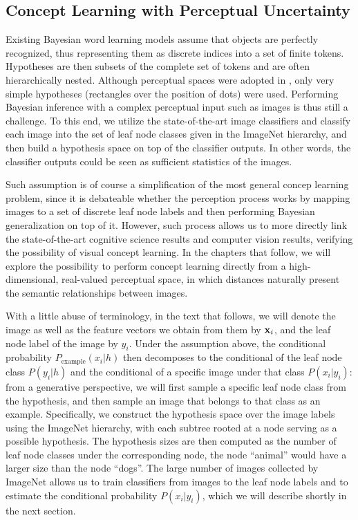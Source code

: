 \subsection{Concept Learning with Perceptual Uncertainty}
Existing Bayesian word learning models assume that objects are perfectly recognized, thus representing them as discrete indices into a set of finite tokens. Hypotheses are then subsets of the complete set of tokens and are often hierarchically nested. Although perceptual spaces were adopted in \cite{tenenbaum99}, only very simple hypotheses (rectangles over the position of dots) were used. Performing Bayesian inference with a complex perceptual input such as images is thus still a challenge. To this end, we utilize the state-of-the-art image classifiers and classify each image into the set of leaf node classes given in the ImageNet hierarchy, and then build a hypothesis space on top of the classifier outputs. In other words, the classifier outputs could be seen as sufficient statistics of the images.

Such assumption is of course a simplification of the most general concep learning problem, since it is debateable whether the perception process works by mapping images to a set of discrete leaf node labels and then performing Bayesian generalization on top of it. However, such process allows us to more directly link the state-of-the-art cognitive science results and computer vision results, verifying the possibility of visual concept learning. In the chapters that follow, we will explore the possibility to perform concept learning directly from a high-dimensional, real-valued perceptual space, in which distances naturally present the semantic relationships between images.

With a little abuse of terminology, in the text that follows, we will denote the image as well as the feature vectors we obtain from them by $\mathbf{x}_i$, and the leaf node label of the image by $y_i$. Under the assumption above, the conditional probability $P_{\mathrm{example}}(x_i|h)$ then decomposes to the conditional of the leaf node class $P(y_i|h)$ and the conditional of a specific image under that class $P(x_i | y_i)$: from a generative perspective, we will first sample a specific leaf node class from the hypothesis, and then sample an image that belongs to that class as an example. Specifically, we construct the hypothesis space over the image labels using the ImageNet hierarchy, with each subtree rooted at a node serving as a possible hypothesis. The hypothesis sizes are then computed as the number of leaf node classes under the corresponding node, \eg the node ``animal'' would have a larger size than the node ``dogs''. The large number of images collected by ImageNet allows us to train classifiers from images to the leaf node labels and to estimate the conditional probability $P(x_i|y_i)$, which we will describe shortly in the next section.

